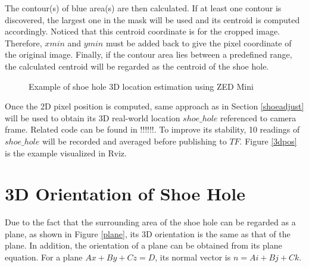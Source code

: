 The contour(s) of blue area(s) are then calculated. If at least one contour is discovered, the largest one in the mask will be used and its centroid is computed accordingly. Noticed that this centroid coordinate is for the cropped image. Therefore, $xmin$ and $ymin$ must be added back to give the pixel coordinate of the original image. Finally, if the contour area lies between a predefined range, the calculated centroid will be regarded as the centroid of the shoe hole.

\begin{figure}[H]
\centering
{}
\caption{Example of shoe hole 3D location estimation using ZED Mini}
\end{figure}

Once the 2D pixel position is computed, same approach as in Section \ref{shoeadjust} will be used to obtain its 3D real-world location $shoe\_hole$ referenced to camera frame. Related code can be found in !!!!!!. To improve its stability, 10 readings of $shoe\_hole$ will be recorded and averaged before publishing to $TF$. Figure \ref{3dpos} is the example visualized in Rviz.

\section{3D Orientation of Shoe Hole} \label{3DOrientationofShoeHole}
Due to the fact that the surrounding area of the shoe hole can be regarded as a plane, as shown in Figure \ref{plane}, its 3D orientation is the same as that of the plane. In addition, the orientation of a plane can be obtained from its plane equation. For a plane $Ax + By + Cz = D$, its normal vector is $n = Ai + Bj + Ck$.

